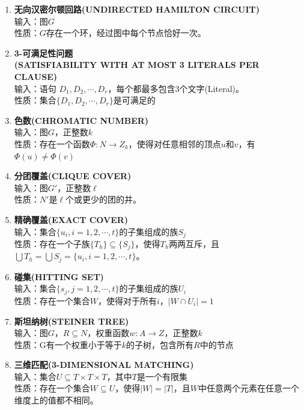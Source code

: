 \documentclass[twocolumn]{article}
\theoremstyle{nonumberplain}%
\begin{document}
\begin{enumerate}
    \item {\bf 无向汉密尔顿回路(UNDIRECTED HAMILTON CIRCUIT)}\\
    输入：图$G$\\
    性质：$G$存在一个环，经过图中每个节点恰好一次。

    \item {\bf 3-可满足性问题\\(SATISFIABILITY WITH AT MOST 3 LITERALS PER CLAUSE)}\\
    输入：语句 $D_1,D_2,\cdots,D_r$，每个都最多包含3个文字(Literal)。\\
    性质：集合$\{D_1,D_2,\cdots,D_r\}$是可满足的

    \item {\bf 色数(CHROMATIC NUMBER)}\\
    输入：图$G$，正整数$k$\\
    性质：存在一个函数$\Phi:N\rightarrow Z_k$，使得对任意相邻的顶点$u$和$v$，有$\Phi(u)\neq\Phi(v)$

    \item {\bf 分团覆盖(CLIQUE COVER)}\\
    输入：图$G'$，正整数$\ell$\\
    性质：$N'$是$\ell$个或更少的团的并。

    \item {\bf 精确覆盖(EXACT COVER)}\\
    输入：集合$\{u_i,i=1,2,\cdots,t\}$的子集组成的族${S_j}$\\
    性质：存在一个子族$\{T_h\}\subseteq\{S_j\}$，使得$T_h$两两互斥，且$\bigcup T_h=\bigcup S_j=\{u_i,i=1,2,\cdots,t\}$。

    \item {\bf 碰集(HITTING SET)}\\
    输入：集合$\{s_j,j=1,2,\cdots,t\}$的子集组成的族${U_i}$\\
    性质：存在一个集合$W$，使得对于所有$i$，$|W\cap U_i|=1$

    \item {\bf 斯坦纳树(STEINER TREE)}\\
    输入：图$G$，$R\subseteq N$，权重函数$w:A\rightarrow Z$，正整数$k$\\
    性质：G有一个权重小于等于$k$的子树，包含所有$R$中的节点

    \item {\bf 三维匹配(3-DIMENSIONAL MATCHING)}\\
    输入：集合$U\subseteq T\times T\times T$，其中$T$是一个有限集\\
    性质：存在一个集合$W\subseteq U$，使得$|W|=|T|$，且$W$中任意两个元素在任意一个维度上的值都不相同。


\end{enumerate}
\end{document}
